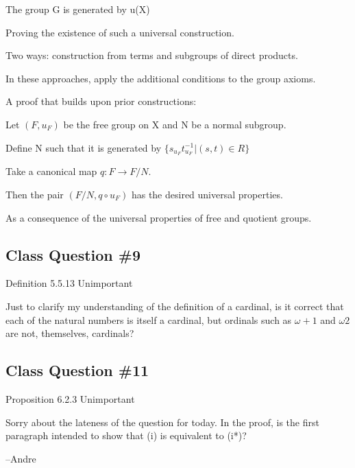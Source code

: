 \documentclass[12pt]{article}
\begin{document}
The group G is generated by u(X)

\noindent
Proving the existence of such a universal construction.

Two ways: construction from terms and subgroups of direct products.

In these approaches, apply the additional conditions to the group axioms.

\noindent
A proof that builds upon prior constructions:

Let $(F, u_F)$ be the free group on X and N be a normal subgroup.

Define N such that it is generated by $\{s_{u_F}t_{u_F}^{-1} | (s, t) \in R\}$

Take a canonical map $q: F \to F \slash N$.

Then the pair $(F\slash N, q \circ u_F)$ has the desired universal properties.

As a consequence of the universal properties of free and quotient groups.

\subsection{Class Question \#9}

Definition 5.5.13
Unimportant

Just to clarify my understanding of the definition of a cardinal, is it correct that each of the natural numbers is itself a cardinal, but ordinals such as $\omega + 1$ and $\omega 2$ are not, themselves, cardinals?

\subsection{Class Question \#11}

Proposition 6.2.3
Unimportant

Sorry about the lateness of the question for today.  In the proof, is the first paragraph intended to show that (i) is equivalent to (i*)?

--Andre
\end{document}
